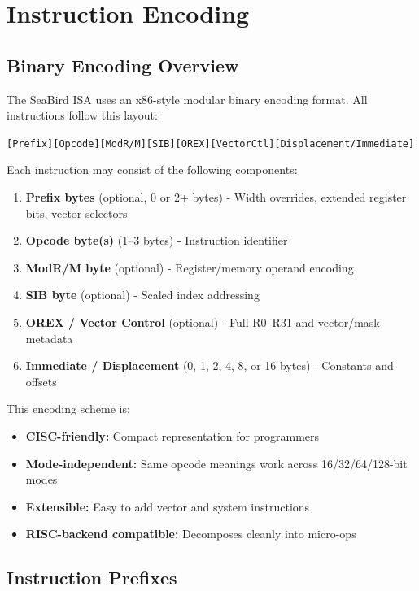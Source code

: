 \documentclass[11pt]{article}
\begin{document}
\section{Instruction Encoding}

\subsection{Binary Encoding Overview}

The SeaBird ISA uses an x86-style modular binary encoding format. All instructions follow this layout:

\begin{center}
\texttt{[Prefix][Opcode][ModR/M][SIB][OREX][VectorCtl][Displacement/Immediate]}
\end{center}

Each instruction may consist of the following components:

\begin{enumerate}
    \item \textbf{Prefix bytes} (optional, 0 or 2+ bytes) - Width overrides, extended register bits, vector selectors
    \item \textbf{Opcode byte(s)} (1--3 bytes) - Instruction identifier
    \item \textbf{ModR/M byte} (optional) - Register/memory operand encoding
    \item \textbf{SIB byte} (optional) - Scaled index addressing
    \item \textbf{OREX / Vector Control} (optional) - Full R0--R31 and vector/mask metadata
    \item \textbf{Immediate / Displacement} (0, 1, 2, 4, 8, or 16 bytes) - Constants and offsets
\end{enumerate}

This encoding scheme is:
\begin{itemize}
    \item \textbf{CISC-friendly:} Compact representation for programmers
    \item \textbf{Mode-independent:} Same opcode meanings work across 16/32/64/128-bit modes
    \item \textbf{Extensible:} Easy to add vector and system instructions
    \item \textbf{RISC-backend compatible:} Decomposes cleanly into micro-ops
\end{itemize}

\subsection{Instruction Prefixes}
\end{document}

